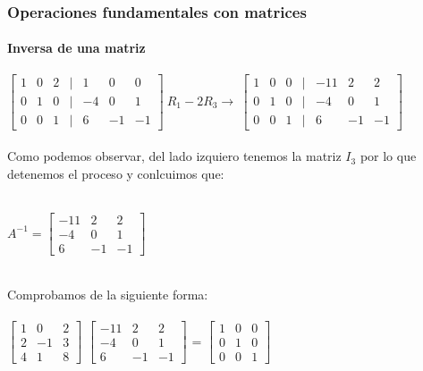 \documentclass[11pt]{beamer}
\begin{document}
\begin{frame}
\frametitle{Operaciones fundamentales con matrices}
\framesubtitle{Inversa de una matriz}
${\displaystyle {\begin{bmatrix}1&0&2&|&1&0&0\\0&1&0&|&-4&0&1\\0&0&1&|&6&-1&-1\end{bmatrix}}} 
~ R_1-2R_3 \rightarrow ~ {\displaystyle {\begin{bmatrix}1&0&0&|&-11&2&2\\0&1&0&|&-4&0&1\\0&0&1&|&6&-1&-1\end{bmatrix}}}$\\ \hspace{0cm} \\
Como podemos observar, del lado izquiero tenemos la matriz $I_3$ por lo que detenemos el proceso y conlcuimos que:\\ \hspace{0cm} \\
\begin{center}
${\displaystyle A^{-1}={\begin{bmatrix}-11&2&2\\-4&0&1\\6&-1&-1\end{bmatrix}}}$\\ \hspace{0cm} \\
\end{center}
Comprobamos de la siguiente forma: \\ \hspace{0cm} \\
${\displaystyle {\begin{bmatrix}1&0&2\\2&-1&3\\4&1&8\end{bmatrix}}}$
${\displaystyle {\begin{bmatrix}-11&2&2\\-4&0&1\\6&-1&-1\end{bmatrix}}}$ = 
${\displaystyle {\begin{bmatrix}1&0&0\\0&1&0\\0&0&1\end{bmatrix}}}$\\ \hspace{0cm} \\
\end{frame}
\end{document}
